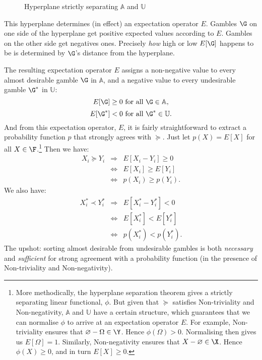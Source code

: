 \begin{figure}[ht]
\caption{Hyperplane strictly separating $\mathbb{A}$ and $\mathbb{U}$} \label{konek-fig-6}
\end{figure}

This hyperplane determines (in effect) an expectation operator $E$. Gambles $\G$ on one side of the hyperplane get positive expected values according to $E$. Gambles on the other side get negatives ones. Precisely \textit{how} high or low $E[\G]$ happens to be is determined by $\G$'s distance from the hyperplane.

The resulting expectation operator $E$ assigns a non-negative value to every almost desirable gamble $\G$ in $\mathbb{A}$, and a negative value to every undesirable gamble $\G^*$ in $\mathbb{U}$:
$$E[\G]\geq 0 \text{ for all } \G\in\mathbb{A},$$
$$E[\G^*]<0   \text{ for all } \G^*\in\mathbb{U}.$$
And from this expectation operator, $E$, it is fairly straightforward to extract a probability function $p$ that strongly agrees with $\succeq$. Just let $p(X)=E[X]$ for all $X\in\F$.\footnote{More methodically, the hyperplane separation theorem gives a strictly separating linear functional, $\phi$. But given that $\succeq$ satisfies Non-triviality and Non-negativity, $\mathbb{A}$ and $\mathbb{U}$ have a certain structure, which guarantees that we can normalise $\phi$ to arrive at an expectation operator $E$. For example, Non-triviality ensures that $\varnothing-\Omega\in\Y$. Hence $\phi(\Omega)>0$. Normalising then gives us $E[\Omega]=1$. Similarly, Non-negativity ensures that $X-\varnothing\in\X$. Hence $\phi(X)\geq0$, and in turn $E[X]\geq0$.} Then we have:
\begin{eqnarray*}
X_i\succeq Y_i & \Rightarrow & E[X_i-Y_i]\geq 0\\
& \Leftrightarrow & E[X_i]\geq E[Y_i]\\
& \Leftrightarrow & p(X_i)\geq p(Y_i).
\end{eqnarray*}
We also have:
\begin{eqnarray*}
X^*_i\prec Y^*_i & \Rightarrow & E[X^*_i-Y^*_i]< 0\\
& \Leftrightarrow & E[X^*_i]< E[Y^*_i]\\
& \Leftrightarrow & p(X^*_i)< p(Y^*_i).
\end{eqnarray*}
The upshot: sorting almost desirable from undesirable gambles is both \textit{necessary} and \textit{sufficient} for strong agreement with a probability function (in the presence of Non-triviality and Non-negativity).

